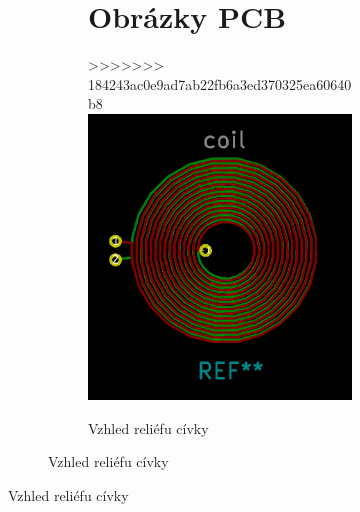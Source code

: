 \begin{figure}
\begin{figure}
\begin{figure}
    \section{Obrázky PCB}
>>>>>>> 184243ac0e9ad7ab22fb6a3ed370325ea60640b8
    \centering
    \includegraphics[width=\textwidth]{kapitoly/obrazky/E4/elektronika_tlakove_desky/civka.png}
    \caption{Vzhled reliéfu cívky}
    \label{fig:E4-relief_civka}
\end{figure}


\end{figure}
\end{figure}
